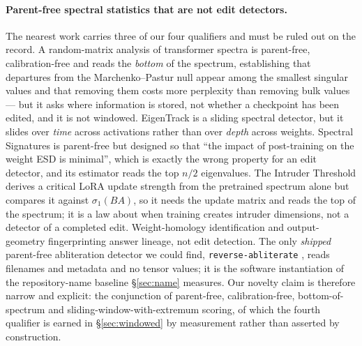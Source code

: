 \documentclass[11pt,letterpaper]{article}
\begin{document}
\paragraph{Parent-free spectral statistics that are not edit detectors.} The nearest work carries three of our four qualifiers and must be ruled out on the record. A random-matrix analysis of transformer spectra \citep{Staats2024} is parent-free, calibration-free and reads the \emph{bottom} of the spectrum, establishing that departures from the Marchenko--Pastur null appear among the smallest singular values and that removing them costs more perplexity than removing bulk values --- but it asks where information is stored, not whether a checkpoint has been edited, and it is not windowed. EigenTrack \citep{Ettori2025} is a sliding spectral detector, but it slides over \emph{time} across activations rather than over \emph{depth} across weights. Spectral Signatures \citep{Zhang2026} is parent-free but designed so that ``the impact of post-training on the weight ESD is minimal'', which is exactly the wrong property for an edit detector, and its estimator reads the top $n/2$ eigenvalues. The Intruder Threshold \citep{Xie2026} derives a critical LoRA update strength from the pretrained spectrum alone but compares it against $\sigma_1(BA)$, so it needs the update matrix and reads the top of the spectrum; it is a law about when training creates intruder dimensions, not a detector of a completed edit. Weight-homology identification and output-geometry fingerprinting answer lineage, not edit detection. The only \emph{shipped} parent-free abliteration detector we could find, \texttt{reverse-abliterate} \citep{ReverseAbliterate}, reads filenames and metadata and no tensor values; it is the software instantiation of the repository-name baseline \S\ref{sec:name} measures. Our novelty claim is therefore narrow and explicit: the conjunction of parent-free, calibration-free, bottom-of-spectrum and sliding-window-with-extremum scoring, of which the fourth qualifier is earned in \S\ref{sec:windowed} by measurement rather than asserted by construction.
\end{document}
